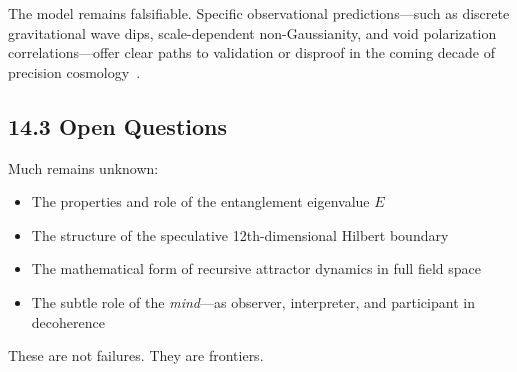 The model remains falsifiable. Specific observational predictions---such as discrete gravitational wave dips, scale-dependent non-Gaussianity, and void polarization correlations---offer clear paths to validation or disproof in the coming decade of precision cosmology~\cite{amaroseoane2017laser, cmbs42019science, laureijs2011euclid}.

\subsection*{14.3 Open Questions}

Much remains unknown:
\begin{itemize}
    \item The properties and role of the entanglement eigenvalue \( E \)
    \item The structure of the speculative 12th-dimensional Hilbert boundary
    \item The mathematical form of recursive attractor dynamics in full field space~\cite{gellmann1994complex}
    \item The subtle role of the \textit{mind}---as observer, interpreter, and participant in decoherence~\cite{tegmark_consciousness_2015, penrose_emperors_1994}
\end{itemize}

These are not failures. They are frontiers.

